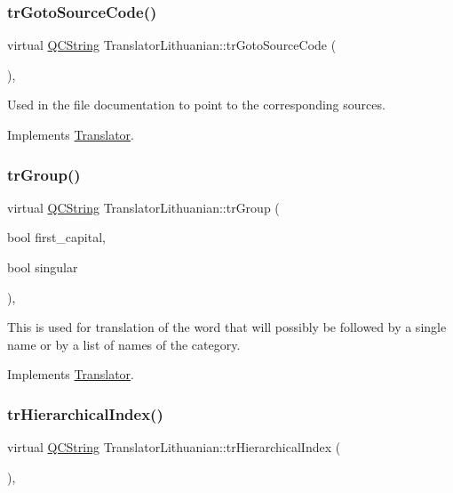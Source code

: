 \subsubsection{\texorpdfstring{trGotoSourceCode()}{trGotoSourceCode()}}
{\footnotesize\ttfamily virtual \mbox{\hyperlink{class_q_c_string}{Q\+C\+String}} Translator\+Lithuanian\+::tr\+Goto\+Source\+Code (\begin{DoxyParamCaption}{ }\end{DoxyParamCaption})\hspace{0.3cm}{\ttfamily [inline]}, {\ttfamily [virtual]}}

Used in the file documentation to point to the corresponding sources. 

Implements \mbox{\hyperlink{class_translator}{Translator}}.

\mbox{\label{class_translator_lithuanian_a3e49c1b86de3a0b7a665a3a3dc968ace}} 
\subsubsection{\texorpdfstring{trGroup()}{trGroup()}}
{\footnotesize\ttfamily virtual \mbox{\hyperlink{class_q_c_string}{Q\+C\+String}} Translator\+Lithuanian\+::tr\+Group (\begin{DoxyParamCaption}\item[{bool}]{first\+\_\+capital,  }\item[{bool}]{singular }\end{DoxyParamCaption})\hspace{0.3cm}{\ttfamily [inline]}, {\ttfamily [virtual]}}

This is used for translation of the word that will possibly be followed by a single name or by a list of names of the category. 

Implements \mbox{\hyperlink{class_translator}{Translator}}.

\mbox{\label{class_translator_lithuanian_a3fdc4b5853cf437c14a3c55846c1bb6b}} 
\subsubsection{\texorpdfstring{trHierarchicalIndex()}{trHierarchicalIndex()}}
{\footnotesize\ttfamily virtual \mbox{\hyperlink{class_q_c_string}{Q\+C\+String}} Translator\+Lithuanian\+::tr\+Hierarchical\+Index (\begin{DoxyParamCaption}{ }\end{DoxyParamCaption})\hspace{0.3cm}{\ttfamily [inline]}, {\ttfamily [virtual]}}

